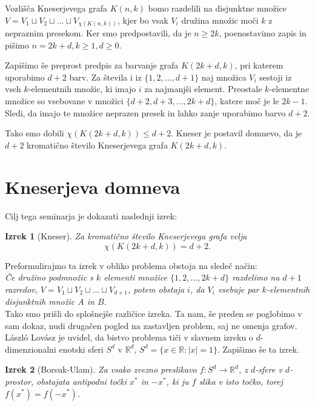 \documentclass[a4paper,12pt]{article}
\newtheorem{izrek}{Izrek}
\begin{document}
Vozlišča Kneserjevega grafa $K(n,k)$ bomo razdelili na disjunktne množice $V = V_1 \sqcup V_2 \sqcup \ldots \sqcup V_{\chi(K(n,k))}$, kjer bo vsak $V_i$ družina množic moči $k$ z nepraznim presekom. Ker smo predpostavili, da je $n \geq 2k$, poenostavimo zapis in pišimo $n = 2k + d, k \geq 1, d \geq 0$.

Zapišimo še preprost predpis za barvanje grafa $K(2k+d,k)$, pri katerem uporabimo $d+2$ barv. Za števila i iz $\{1,2,\ldots,d+1\}$ naj množica $V_i$ sestoji iz vseh $k$-elementnih množic, ki imajo $i$ za najmanjši element. Preostale $k$-elementne množice so vsebovane v množici $\{d+2,d+3,\ldots,2k+d\}$, katere moč je le $2k-1$. Sledi, da imajo te množice neprazen presek in lahko zanje uporabimo barvo $d+2$. 

Tako smo dobili $\chi(K(2k+d,k)) \leq d+2$. Kneser je postavil domnevo, da je $d+2$ kromatično število Kneserjevega grafa $K(2k+d,k)$.

\section{Kneserjeva domneva}

Cilj tega seminarja je dokazati naslednji izrek: \\

\begin{izrek}[Kneser]
Za kromatično število Kneserjevega grafa velja
$$\chi(K(2k+d,k)) = d+2.$$
\end{izrek}

\noindent
Preformulirajmo ta izrek v obliko problema obstoja na sledeč način: \\

\noindent
{\em Če družino podmnožic s $k$ elementi množice $\{1, 2, \ldots, 2k+d\}$ razdelimo na $d+1$ razredov,  $V = V_1 \sqcup V_2 \sqcup \ldots \sqcup V_{d+1}$, potem obstaja $i$, da $V_i$ vsebuje par $k$-elementnih disjunktnih množic $A$ in $B$.} \\

Tako smo prišli do splošnejše različice izreka. Ta nam, še preden se poglobimo v sam dokaz, nudi drugačen pogled na zastavljen problem, saj ne omenja grafov. László Lovász je uvidel, da bistvo problema tiči v slavnem izreku o $d$-dimenzionalni enotski sferi $S^d$ v $\mathbb{R}^d $, $S^d = \{x \in \mathbb{R}: |x|=1\}$. Zapišimo še ta izrek.

\begin{izrek}[Borsuk-Ulam]
Za vsako zvezno preslikavo $f:S^d \rightarrow \mathbb{R}^d$, z $d$-sfere v $d$-prostor, obstajata antipodni točki $x^*$ in $-x^*$, ki ju $f$ slika v isto točko, torej $f(x^*)=f(-x^*)$.
\end{izrek}
\end{document}
